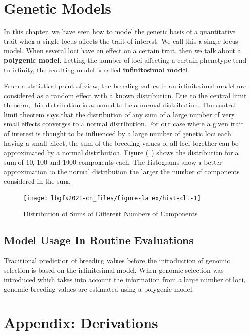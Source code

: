 \documentclass[
]{book}
\theoremstyle{definition}
\theoremstyle{definition}
\theoremstyle{definition}
\theoremstyle{remark}
\begin{document}
\hypertarget{genetic-models}{%
\section{Genetic Models}\label{genetic-models}}

In this chapter, we have seen how to model the genetic basis of a quantitative trait when a single locus affects the trait of interest. We call this a single-locus model. When several loci have an effect on a certain trait, then we talk about a \textbf{polygenic model}. Letting the number of loci affecting a certain phenotype tend to infinity, the resulting model is called \textbf{infinitesimal model}.

From a statistical point of view, the breeding values in an infinitesimal model are considered as a random effect with a known distribution. Due to the central limit theorem, this distribution is assumed to be a normal distribution. The central limit theorem says that the distribution of any sum of a large number of very small effects converges to a normal distribution. For our case where a given trait of interest is thought to be influenced by a large number of genetic loci each having a small effect, the sum of the breeding values of all loci together can be approximated by a normal distribution. Figure (\ref{fig:hist-clt}) shows the distribution for a sum of 10, 100 and 1000 components each. The histograms show a better approximation to the normal distribution the larger the number of components considered in the sum.

\begin{figure}[!ht]
\texttt{[image: lbgfs2021-cn\_files/figure-latex/hist-clt-1]} \caption{Distribution of Sums of Different Numbers of Components}\label{fig:hist-clt}
\end{figure}

\hypertarget{model-usage-in-routine-evaluations}{%
\subsection{Model Usage In Routine Evaluations}\label{model-usage-in-routine-evaluations}}

Traditional prediction of breeding values before the introduction of genomic selection is based on the infinitesimal model. When genomic selection was introduced which takes into account the information from a large number of loci, genomic breeding values are estimated using a polygenic model.

\hypertarget{appendix-derivations}{%
\section{Appendix: Derivations}\label{appendix-derivations}}
\end{document}
